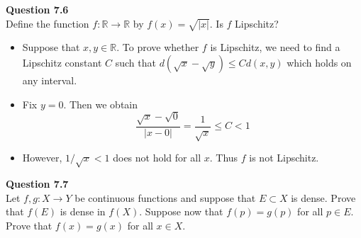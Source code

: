 \documentclass[12pt]{article}
\begin{document}
\vspace{1.5\baselineskip}
\textbf{Question 7.6}\\
Define the function $f\colon\mathbb{R}\rightarrow\mathbb{R}$ by $f(x)=\sqrt{|x|}$. Is $f$ Lipschitz?
\begin{itemize}
    \item Suppose that $x,y\in \mathbb{R}$. To prove whether $f$ is Lipschitz, we need to find a Lipschitz constant $C$ such that $d(\sqrt{x}-\sqrt{y})\le Cd(x,y)$ which holds on any interval.
    \item Fix $y=0$. Then we obtain 
    $$\frac{\sqrt{x}-\sqrt{0}}{|x-0|} = \frac{1}{\sqrt{x}} \le C <1$$
    \item However, $1/\sqrt{x} < 1$ does not hold for all $x$. Thus $f$ is not Lipschitz.
\end{itemize}
\vspace{1.5\baselineskip}
\textbf{Question 7.7}\\
Let $f,g: X\rightarrow Y$ be continuous functions and suppose that $E\subset X$ is dense. Prove that $f(E)$ is dense in $f(X)$. Suppose now that $f(p) = g(p)$ for all $p\in E$. Prove that $f(x)=g(x)$ for all $x\in X$.
\end{document}
